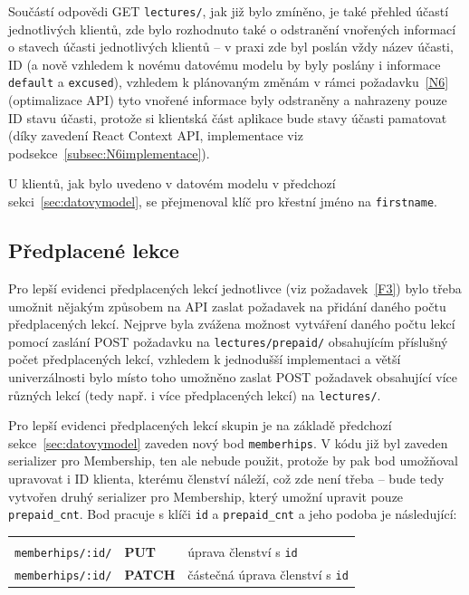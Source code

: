 Součástí odpovědi GET \verb|lectures/|, jak již bylo zmíněno, je také přehled účastí jednotlivých klientů, zde bylo rozhodnuto také o odstranění vnořených informací o stavech účasti jednotlivých klientů -- v praxi zde byl poslán vždy název účasti, ID (a nově vzhledem k novému datovému modelu by byly poslány i informace \verb|default| a \verb|excused|), vzhledem k plánovaným změnám v rámci požadavku~\ref{N6} (optimalizace API) tyto vnořené informace byly odstraněny a nahrazeny pouze ID stavu účasti, protože si klientská část aplikace bude stavy účasti pamatovat (díky zavedení React Context API, implementace viz podsekce~\ref{subsec:N6implementace}).

U klientů, jak bylo uvedeno v datovém modelu v předchozí sekci~\ref{sec:datovymodel}, se přejmenoval klíč pro křestní jméno na \verb|firstname|.
    
\newcommand{\apiA}{0.33}
\newcommand{\apiB}{0.14}
\newcommand{\apiC}{0.43}

\subsection{Předplacené lekce}

Pro lepší evidenci předplacených lekcí jednotlivce (viz požadavek~\ref{F3}) bylo třeba umožnit nějakým způsobem na API zaslat požadavek na přidání daného počtu předplacených lekcí. Nejprve byla zvážena možnost vytváření daného počtu lekcí pomocí zaslání POST požadavku na \verb|lectures/prepaid/| obsahujícím příslušný počet předplacených lekcí, vzhledem k jednodušší implementaci a větší univerzálnosti bylo místo toho umožněno zaslat POST požadavek obsahující více různých lekcí (tedy např. i více předplacených lekcí) na \verb|lectures/|.

Pro lepší evidenci předplacených lekcí skupin je na základě předchozí sekce~\ref{sec:datovymodel} zaveden nový bod \verb|memberhips|. V kódu již byl zaveden serializer pro Membership, ten ale nebude použit, protože by pak bod umožňoval upravovat i ID klienta, kterému členství náleží, což zde není třeba -- bude tedy vytvořen druhý serializer pro Membership, který umožní upravit pouze \verb|prepaid_cnt|. Bod pracuje s klíči \verb|id| a \verb|prepaid_cnt| a jeho podoba je následující:

{\centering
\begin{tabular}{p{\apiA\textwidth} p{\apiB\textwidth} p{\apiC\textwidth}}&&\\
    \verb|memberhips/:id/|     & \textbf{PUT}      & úprava členství s \verb|id|\\
    \verb|memberhips/:id/|     & \textbf{PATCH}    & částečná úprava členství s \verb|id|\\
\end{tabular}}

